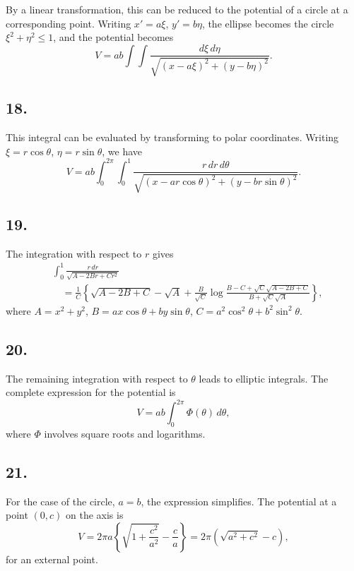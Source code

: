 \documentclass[11pt,a4paper]{book}
\begin{document}
By a linear transformation, this can be reduced to the potential of a circle
at a corresponding point. Writing $x'=a\xi$, $y'=b\eta$, the ellipse
becomes the circle $\xi^2+\eta^2\leq 1$, and the potential becomes
\[
V = ab\int\!\!\!\int \frac{d\xi\,d\eta}
                         {\sqrt{(x-a\xi)^2+(y-b\eta)^2}}.
\]

\subsection*{18.}

This integral can be evaluated by transforming to polar coordinates. Writing
$\xi=r\cos\theta$, $\eta=r\sin\theta$, we have
\[
V = ab\int_0^{2\pi}\int_0^1
    \frac{r\,dr\,d\theta}
         {\sqrt{(x-ar\cos\theta)^2+(y-br\sin\theta)^2}}.
\]

\subsection*{19.}

The integration with respect to $r$ gives
\begin{align*}
&\int_0^1 \frac{r\,dr}{\sqrt{A-2Br+Cr^2}} \\
&\quad = \frac{1}{C}\left\{
      \sqrt{A-2B+C} - \sqrt{A}
      + \frac{B}{\sqrt{C}}
        \log\frac{B-C+\sqrt{C}\sqrt{A-2B+C}}
                    {B+\sqrt{C}\sqrt{A}}
    \right\},
\end{align*}
where $A=x^2+y^2$, $B=ax\cos\theta+by\sin\theta$,
$C=a^2\cos^2\theta+b^2\sin^2\theta$.

\newpage
\subsection*{20.}

The remaining integration with respect to $\theta$ leads to elliptic
integrals. The complete expression for the potential is
\[
V = ab\int_0^{2\pi} \Phi(\theta)\,d\theta,
\]
where $\Phi$ involves square roots and logarithms.

\subsection*{21.}

For the case of the circle, $a=b$, the expression simplifies. The potential
at a point $(0,c)$ on the axis is
\[
V = 2\pi a\left\{\sqrt{1+\frac{c^2}{a^2}} - \frac{c}{a}\right\}
  = 2\pi\left(\sqrt{a^2+c^2}-c\right),
\]
for an external point.
\end{document}
